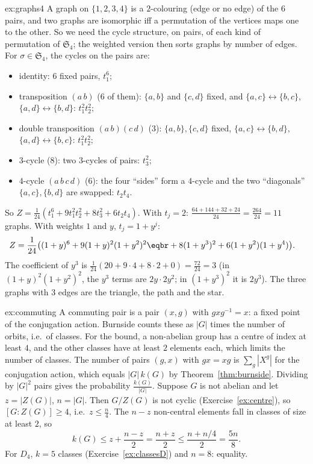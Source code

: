 \begin{solution}{ex:graphs4}
\idea A graph on $\{1,2,3,4\}$ is a $2$-colouring (edge or no edge) of the $6$ pairs, and two graphs are isomorphic iff a permutation of the vertices maps one to the other. So we need the cycle structure, on pairs, of each kind of permutation of $\mathfrak S_4$; the weighted version then sorts graphs by number of edges.
\writeup For $\sigma\in\mathfrak S_4$, the cycles on the pairs are:
\begin{itemize}
\item identity: $6$ fixed pairs, $t_1^6$;
\item transposition $(a\,b)$ ($6$ of them): $\{a,b\}$ and $\{c,d\}$ fixed, and $\{a,c\}\leftrightarrow\{b,c\}$, $\{a,d\}\leftrightarrow\{b,d\}$: $t_1^2t_2^2$;
\item double transposition $(a\,b)(c\,d)$ ($3$): $\{a,b\},\{c,d\}$ fixed, $\{a,c\}\leftrightarrow\{b,d\}$, $\{a,d\}\leftrightarrow\{b,c\}$: $t_1^2t_2^2$;
\item $3$-cycle ($8$): two $3$-cycles of pairs: $t_3^2$;
\item $4$-cycle $(a\,b\,c\,d)$ ($6$): the four ``sides'' form a $4$-cycle and the two ``diagonals'' $\{a,c\},\{b,d\}$ are swapped: $t_2t_4$.
\end{itemize}
So $Z=\frac1{24}\left(t_1^6+9t_1^2t_2^2+8t_3^2+6t_2t_4\right)$. With $t_j=2$: $\frac{64+144+32+24}{24}=\frac{264}{24}=11$ graphs.
With weights $1$ and $y$, $t_j=1+y^j$:
\[
\begin{aligned}Z&=\frac1{24}\big((1+y)^6+9(1+y)^2(1+y^2)^2\eqbr+8(1+y^3)^2+6(1+y^2)(1+y^4)\big).\end{aligned}
\]
The coefficient of $y^3$ is $\frac1{24}\left(20+9\cdot4+8\cdot2+0\right)=\frac{72}{24}=3$ (in $(1+y)^2(1+y^2)^2$, the $y^3$ terms are $2y\cdot2y^2$; in $(1+y^3)^2$ it is $2y^3$). The three graphs with $3$ edges are the triangle, the path and the star.
\end{solution}

\begin{solution}{ex:commuting}
\idea A commuting pair is a pair $(x,g)$ with $gxg^{-1}=x$: a fixed point of the conjugation action. Burnside counts these as $|G|$ times the number of orbits, i.e.\ of classes. For the bound, a non-abelian group has a centre of index at least $4$, and the other classes have at least $2$ elements each, which limits the number of classes.
\writeup The number of pairs $(g,x)$ with $gx=xg$ is $\sum_g|X^g|$ for the conjugation action, which equals $|G|\,k(G)$ by Theorem~\ref{thm:burnside}. Dividing by $|G|^2$ pairs gives the probability $\frac{k(G)}{|G|}$.
Suppose $G$ is not abelian and let $z=|Z(G)|$, $n=|G|$. Then $G/Z(G)$ is not cyclic (Exercise~\ref{ex:centre}), so $[G:Z(G)]\ge4$, i.e.\ $z\le\frac n4$. The $n-z$ non-central elements fall in classes of size at least $2$, so
\[
k(G)\le z+\frac{n-z}2=\frac{n+z}2\le\frac{n+n/4}2=\frac{5n}8.
\]
For $D_4$, $k=5$ classes (Exercise~\ref{ex:classesD}) and $n=8$: equality.
\end{solution}

